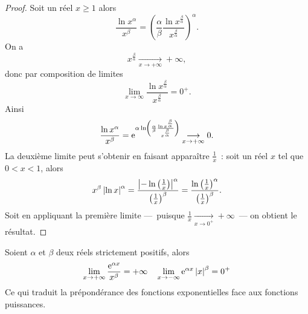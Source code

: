 \begin{proof}
  Soit un réel $x \geq 1$ alors
  \begin{equation}
    \frac{\ln x^\alpha}{x^\beta}=\left(\frac{\alpha}{\beta} \frac{\ln x^{\frac{\beta}{\alpha}}}{x^{\frac{\beta}{\alpha}}} \right)^\alpha.
  \end{equation}
  On a
  \begin{equation}
    x^{\frac{\beta}{\alpha}}\underset{x \to +\infty}{\longrightarrow}+\infty,
  \end{equation}
  donc par composition de limites
  \begin{equation}
    \lim\limits_{x \to \infty} \frac{\ln x^{\frac{\beta}{\alpha}}}{x^{\frac{\beta}{\alpha}}}=0^{+}.
  \end{equation}
  Ainsi
  \begin{equation}
    \frac{\ln x ^\alpha}{x^\beta}=\operatorname{e}^{\alpha \ln \left(\frac{\alpha}{\beta} \frac{\ln x^{\frac{\beta}{\alpha}}}{x^{\frac{\beta}{\alpha}}} \right)} \underset{x \to +\infty}{\longrightarrow}0.
  \end{equation}
  La deuxième limite peut s'obtenir en faisant apparaître $\frac{1}{x}$~: soit un réel $x$ tel que $0<x<1$, alors
  \begin{equation}
    x^\beta \left\lvert\ln x\right\rvert^\alpha=\frac{\left\lvert-\ln\left(\frac{1}{x}\right)\right\rvert^\alpha}{\left(\frac{1}{x} \right)^\beta}=\frac{\ln\left(\frac{1}{x}\right)^\alpha}{\left(\frac{1}{x}\right)^\beta}.
  \end{equation}
  Soit en appliquant la première limite ---~puisque $\frac{1}{x}\underset{x \to 0^+}{\longrightarrow}+\infty$~--- on obtient le résultat.
\end{proof}
%
\begin{prop}
  Soient $\alpha$ et $\beta$ deux réels strictement positifs, alors
  \begin{equation}
    \lim\limits_{x \to + \infty} \frac{\operatorname{e}^{\alpha x}}{x^\beta}=+\infty \quad \lim\limits_{x \to -\infty} \operatorname{e}^{\alpha x} \left\lvert x\right\rvert^\beta=0^+
  \end{equation}
  Ce qui traduit la prépondérance des fonctions exponentielles face aux fonctions puissances.
\end{prop}
%
